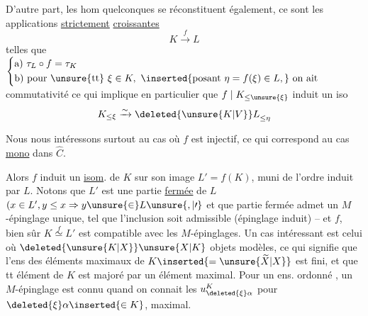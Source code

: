 D'autre part, les hom quelconques  se réconstituent également, ce sont les applications \uline{strictement} \uline{croissantes}
\[
K\xrightarrow{f}L
\]
telles que $\left\{\begin{aligned}
&\text{a) }\tau_L\circ f=\tau_K\\
&\text{b) pour \unsure{tt} }\xi\in K,\ \inserted{\text{posant }\eta=f(\xi)\in L,}\ \text{on ait}
\end{aligned}\right.$ commutativité 
ce qui implique en particulier que $f\mid K_{\leq\unsure{\xi}}$ induit un iso
\[
K_{\leq\xi}\xrightarrow{\sim}{\deleted{\unsure{K|V}}L}_{\leq\eta}
\]

Nous nous intéressons surtout au cas où $f$ est injectif, ce qui correspond au  cas  \uline{mono} dans $\widehat C$.

Alors $f$ induit un \uline{isom}. de $K$ sur  son image $L'=f(K)$, muni de l'ordre induit par $L$. Notons que $L'$ est une partie \uline{fermée} de $L$ $(x\in L',y\leq x\Rightarrow y\unsure{\in}L\unsure{,|\prime}$ et que  partie fermée admet un $M$-épinglage  unique, tel que l'inclusion soit admissible (épinglage induit) -- et   $f$, bien sûr $K\overset{f}{\simeq}L'$ est compatible avec les $M$-épinglages.
Un cas intéressant est celui où $\deleted{\unsure{K|X}}\unsure{X|K}$  objets modèles, ce qui signifie que l'ens des éléments maximaux de $K\inserted{=\unsure{\widetilde X|X}}$ est fini, et que tt élément de $K$ est majoré par un élément maximal. Pour un ens. ordonné   , un $M$-épinglage est connu quand on connait les $u^K_{\deleted{\xi}\alpha}$ pour $\deleted{\xi}\alpha\inserted{\in K}$, maximal.

